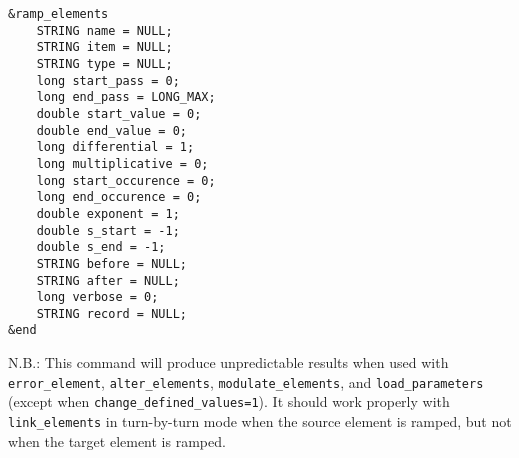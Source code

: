 \documentclass[11pt]{article}
\begin{document}
\begin{verbatim}
&ramp_elements
    STRING name = NULL;
    STRING item = NULL;
    STRING type = NULL;
    long start_pass = 0;
    long end_pass = LONG_MAX;
    double start_value = 0;
    double end_value = 0;
    long differential = 1;
    long multiplicative = 0;
    long start_occurence = 0;
    long end_occurence = 0;
    double exponent = 1;
    double s_start = -1;
    double s_end = -1;
    STRING before = NULL;
    STRING after = NULL;
    long verbose = 0;
    STRING record = NULL;
&end
\end{verbatim}

N.B.: This command will produce unpredictable results when used with
\verb|error_element|, \verb|alter_elements|, \verb|modulate_elements|, and
\verb|load_parameters| (except when \verb|change_defined_values=1|).
It should work properly with \verb|link_elements| in turn-by-turn mode
when the source element is ramped, but not when the target element
is ramped.
\end{document}
